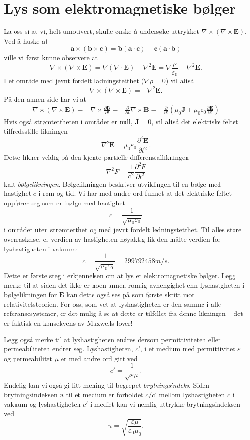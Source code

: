 \documentclass[twoside,utf8]{article}
\begin{document}
\section{Lys som elektromagnetiske bølger}
La oss si at vi, helt umotivert, skulle ønske å undersøke uttrykket $\nabla \times (\nabla \times \mathbf{E})$. Ved å huske at
$$
\mathbf{a}\times (\mathbf{b} \times \mathbf{c}) = \mathbf{b}(\mathbf{a}\cdot \mathbf{c})-\mathbf{c}(\mathbf{a} \cdot \mathbf{b})
$$
ville vi først kunne observere at
$$
\nabla \times (\nabla \times \mathbf{E}) = \nabla (\nabla \cdot \mathbf{E}) - \nabla^2 \mathbf{E} = \nabla \frac{\rho}{\varepsilon_0} - \nabla^2 \mathbf{E}.
$$
I et område med jevnt fordelt ladningstetthet ($\nabla \rho = 0$) vil altså
$$
\nabla \times (\nabla \times \mathbf{E}) = - \nabla^2 \mathbf{E}.
$$
På den annen side har vi at
$$
\begin{aligned}
\nabla \times (\nabla \times \mathbf{E})
=
- \nabla \times \frac{\partial \mathbf{B}}{\partial t}
=
- \frac{\partial}{\partial t} \nabla \times \mathbf{B}
=
- \frac{\partial}{\partial t}
\left(
\mu_0 \mathbf{J}
+
\mu_0 \varepsilon_0 \frac{\partial \mathbf{E}}{\partial t}
\right)
\end{aligned}
$$
Hvis også strømtettheten i området er null, $\mathbf{J}=0$, vil altså det elektriske feltet tilfredsstille likningen
$$
\nabla^2 \mathbf{E}
=
\mu_0 \varepsilon_0 \frac{\partial^2 \mathbf{E}}{\partial t^2}.
$$
Dette likner veldig på den kjente partielle differensiallikningen
$$
\nabla^2 F
=
\frac{1}{c^2} \frac{\partial^2 F}{\partial t^2}
$$
kalt {\it bølgelikningen}. Bølgelikningen beskriver utviklingen til en bølge med hastighet $c$ i rom og tid. Vi har med andre ord funnet at det elektriske feltet oppfører seg som en bølge med hastighet
$$
c = \frac{1}{\sqrt{\mu_0 \varepsilon_0}}
$$
i områder uten strømtetthet og med jevnt fordelt ledningstetthet. Til alles store overraskelse, er verdien av hastigheten nøyaktig lik den målte verdien for lyshastigheten i vakuum:
$$
c = \frac{1}{\sqrt{\mu_0 \varepsilon_0}} = 299792458 m/s.
$$
Dette er første steg i erkjennelsen om at lys er elektromagnetiske bølger. Legg merke til at siden det ikke er noen annen romlig avhengighet enn lyshastgheten i bølgelikningen for $\mathbf{E}$ kan dette også ses på som første skritt mot relativitetsteorien. For oss, som vet at lyshastigheten er den samme i alle referansesystemer, er det mulig å se at dette er tilfellet fra denne likningen -- det er faktisk en konsekvens av Maxwells lover!

Legg også merke til at lyshastigheten endres dersom permittiviteten eller permeabiliteten endrer seg. Lyshastigheten, $c'$, i et medium med permittivitet $\varepsilon$ og permeabilitet $\mu$ er med andre ord gitt ved
$$
	c' = \frac{1}{\sqrt{\varepsilon\mu}}.
$$
Endelig kan vi også gi litt mening til begrepet {\it brytningsindeks}. Siden brytningsindeksen $n$ til et medium er forholdet $c/c'$ mellom lyshastigheten $c$ i vakuum og lyshastigheten $c'$ i mediet kan vi nemlig uttrykke brytningsindeksen ved
$$
n = \sqrt{\frac{\varepsilon\mu}{\varepsilon_0\mu_0}}.
$$
\end{document}
